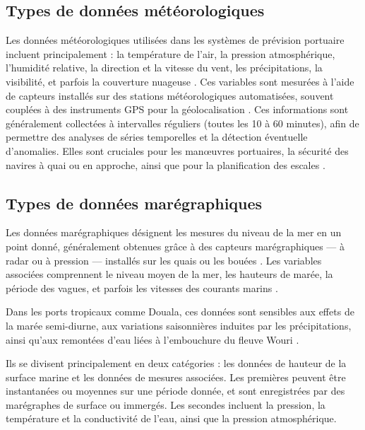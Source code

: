 \documentclass[a4paper,12pt,openany]{report}
\begin{document}
	\subsection{  Types de données météorologiques }
	
	\quad Les données météorologiques utilisées dans les systèmes de prévision portuaire incluent principalement : la température de l’air, la pression atmosphérique, l’humidité relative, la direction et la vitesse du vent, les précipitations, la visibilité, et parfois la couverture nuageuse \cite{OMM2018}. Ces variables sont mesurées à l’aide de capteurs installés sur des stations météorologiques automatisées, souvent couplées à des instruments GPS pour la géolocalisation \cite{Pena2020}. Ces informations sont généralement collectées à intervalles réguliers (toutes les 10 à 60 minutes), afin de permettre des analyses de séries temporelles et la détection éventuelle d’anomalies. Elles sont cruciales pour les manœuvres portuaires, la sécurité des navires à quai ou en approche, ainsi que pour la planification des escales \cite{Pena2020}.
	
	
	
	
	\subsection{Types de données marégraphiques}
	
	\quad Les données marégraphiques désignent les mesures du niveau de la mer en un point donné, généralement obtenues grâce à des capteurs marégraphiques — à radar ou à pression — installés sur les quais ou les bouées \cite{COIUNESCO2016}. Les variables associées comprennent le niveau moyen de la mer, les hauteurs de marée, la période des vagues, et parfois les vitesses des courants marins \cite{Pugh2014}.
	
	\quad Dans les ports tropicaux comme Douala, ces données sont sensibles aux effets de la marée semi-diurne, aux variations saisonnières induites par les précipitations, ainsi qu’aux remontées d’eau liées à l’embouchure du fleuve Wouri \cite{Ngatcha2021}.
	
	
	\quad Ils se divisent principalement en deux catégories : les données de hauteur de la surface marine et les données de mesures associées. Les premières peuvent être instantanées ou moyennes sur une période donnée, et sont enregistrées par des marégraphes de surface ou immergés. Les secondes incluent la pression, la température et la conductivité de l’eau, ainsi que la pression atmosphérique.
	
\end{document}
